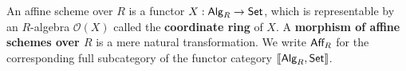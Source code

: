 	\begin{definition}
		An affine scheme over $R$ is a functor $X:\textsf{Alg}_R \rightarrow \textsf{Set}$, which is representable by an $R$-algebra $\mathcal{O}(X)$ called the \textbf{coordinate ring} of $X$. A \textbf{morphism of affine schemes over $R$} is a mere natural transformation. We write $\textsf{Aff}_R$ for the corresponding full subcategory of the functor category $|[\textsf{Alg}_R,\textsf{Set}|]$.
	\end{definition}

